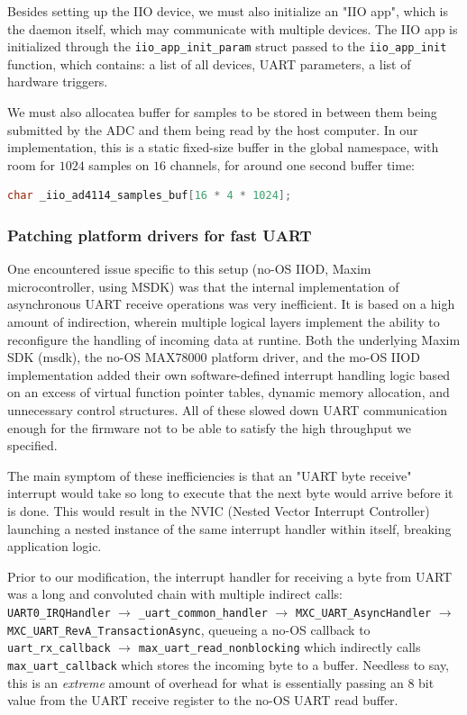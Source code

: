 \documentclass{thesis}
\begin{document}
Besides setting up the IIO device, we must also initialize an "IIO app", which is the daemon itself, which may communicate with multiple devices. The IIO app is initialized through the \texttt{iio\_app\_init\_param} struct passed to the \texttt{iio\_app\_init} function, which contains: a list of all devices, UART parameters, a list of hardware triggers.

We must also allocatea buffer for samples to be stored in between them being submitted by the ADC and them being read by the host computer. In our implementation, this is a static fixed-size buffer in the global namespace, with room for $1024$ samples on $16$ channels, for around one second buffer time:

\begin{lstlisting}[language=C]
char _iio_ad4114_samples_buf[16 * 4 * 1024];
\end{lstlisting}

\subsubsection{Patching platform drivers for fast UART}

One encountered issue specific to this setup (no-OS IIOD, Maxim microcontroller, using MSDK) was that the internal implementation of asynchronous UART receive operations was very inefficient. It is based on a high amount of indirection, wherein multiple logical layers implement the ability to reconfigure the handling of incoming data at runtine. Both the underlying Maxim SDK (msdk), the no-OS MAX78000 platform driver, and the mo-OS IIOD implementation added their own software-defined interrupt handling logic based on an excess of virtual function pointer tables, dynamic memory allocation, and unnecessary control structures. All of these slowed down UART communication enough for the firmware not to be able to satisfy the high throughput we specified.

The main symptom of these inefficiencies is that an "UART byte receive" interrupt would take so long to execute that the next byte would arrive before it is done. This would result in the NVIC (Nested Vector Interrupt Controller) launching a nested instance of the same interrupt handler within itself, breaking application logic.

Prior to our modification, the interrupt handler for receiving a byte from UART was a long and convoluted chain with multiple indirect calls:\\
\texttt{UART0\_IRQHandler} $\to$ \texttt{\_uart\_common\_handler} $\to$ \texttt{MXC\_UART\_AsyncHandler} $\to$\\
\texttt{MXC\_UART\_RevA\_TransactionAsync}, queueing a no-OS callback to \texttt{uart\_rx\_callback} $\to$ \texttt{max\_uart\_read\_nonblocking} which indirectly calls \texttt{max\_uart\_callback} which stores the incoming byte to a buffer. Needless to say, this is an \textit{extreme} amount of overhead for what is essentially passing an 8 bit value from the UART receive register to the no-OS UART read buffer.
\end{document}
